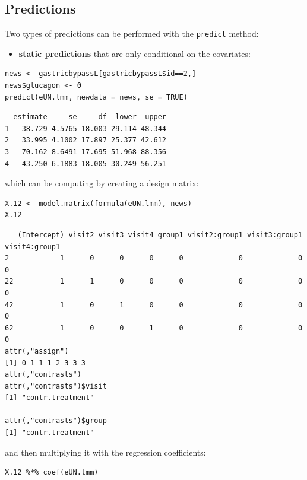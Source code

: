 \documentclass[12pt]{article}
\begin{document}
\clearpage

\subsection{Predictions}
\label{sec:orgfdf09e2}

Two types of predictions can be performed with the \texttt{predict} method:
\begin{itemize}
\item \textbf{static predictions} that are only conditional on the covariates:
\end{itemize}
\lstset{language=r,label= ,caption= ,captionpos=b,numbers=none}
\begin{lstlisting}
news <- gastricbypassL[gastricbypassL$id==2,]
news$glucagon <- 0
predict(eUN.lmm, newdata = news, se = TRUE)
\end{lstlisting}

\begin{verbatim}
  estimate     se     df  lower  upper
1   38.729 4.5765 18.003 29.114 48.344
2   33.995 4.1002 17.897 25.377 42.612
3   70.162 8.6491 17.695 51.968 88.356
4   43.250 6.1883 18.005 30.249 56.251
\end{verbatim}


which can be computing by creating a design matrix:
\lstset{language=r,label= ,caption= ,captionpos=b,numbers=none}
\begin{lstlisting}
X.12 <- model.matrix(formula(eUN.lmm), news)
X.12
\end{lstlisting}

\begin{verbatim}
   (Intercept) visit2 visit3 visit4 group1 visit2:group1 visit3:group1 visit4:group1
2            1      0      0      0      0             0             0             0
22           1      1      0      0      0             0             0             0
42           1      0      1      0      0             0             0             0
62           1      0      0      1      0             0             0             0
attr(,"assign")
[1] 0 1 1 1 2 3 3 3
attr(,"contrasts")
attr(,"contrasts")$visit
[1] "contr.treatment"

attr(,"contrasts")$group
[1] "contr.treatment"
\end{verbatim}

and then multiplying it with the regression coefficients:
\lstset{language=r,label= ,caption= ,captionpos=b,numbers=none}
\begin{lstlisting}
X.12 %*% coef(eUN.lmm)
\end{lstlisting}
\end{document}
